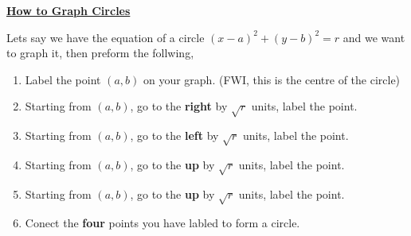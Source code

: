 \documentclass[12pt]{article} %
\begin{document}
	\renewcommand*{\coursecode}{MATH 235} %
	\renewcommand*{\assgnnumber}{Assignment 1} %
	\renewcommand*{\submdate}{September 14, 2021} %
	\renewcommand*{\studentfname}{Abdullah} %
	\renewcommand*{\studentlname}{Zubair} %
    \renewcommand*{\proofname}{Proof:}

	\renewcommand\qedsymbol{$\blacksquare$}
	\setfigpath
	\fancyhfoffset[L,O]{0pt} %




\begin{center}
	\textbf{\underline{\Huge{How to Graph Circles}}}
\end{center}

	\vspace*{0.5cm}
	Lets say we have the equation of a circle $(x-a)^2 + (y-b)^2 = r$ and we want to graph it, then preform the follwing,
	\begin{enumerate}
		\item Label the point $(a,b)$ on your graph. (FWI, this is the centre of the circle)
		\item Starting from $(a,b)$, go to the \textbf{right} by $\sqrt{r} $ units, label the point.
		\item Starting from $(a,b)$, go to the \textbf{left} by $\sqrt{r} $ units, label the point.
		\item Starting from $(a,b)$, go to the \textbf{up} by $\sqrt{r} $ units, label the point.
		\item Starting from $(a,b)$, go to the \textbf{up} by $\sqrt{r} $ units, label the point.
		\item Conect the \textbf{four} points you have labled to form a circle.
\end{enumerate}
\end{document}
